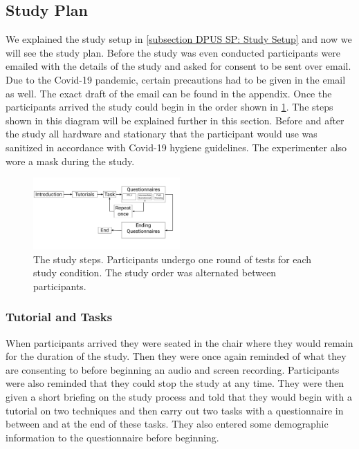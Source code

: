 \subsection{Study Plan}
\label{subsection DPUS SP: Study Plan}
We explained the study setup in \cref{subsection DPUS SP: Study Setup} and now we will see the study plan. Before the study was even conducted participants were emailed with the details of the study and asked for consent to be sent over email. Due to the Covid-19 pandemic, certain precautions had to be given in the email as well. The exact draft of the email can be found in the appendix. Once the participants arrived the study could begin in the order shown in \cref{fig:study-plan}. The steps shown in this diagram will be explained further in this section. Before and after the study all hardware and stationary that the participant would use was sanitized in accordance with Covid-19 hygiene guidelines. The experimenter also wore a mask during the study.

\begin{figure}[]
	\centering
	\includegraphics[width=0.5\textwidth]{images/study-plan.pdf}
	\caption{The study steps. Participants undergo one round of tests for each study condition. The study order was alternated between participants.}
	\label{fig:study-plan}
\end{figure}

\subsubsection{Tutorial and Tasks}
\label{subsubsection DPUS SP SP: Tutorial and Tasks}
When participants arrived they were seated in the chair where they would remain for the duration of the study. Then they were once again reminded of what they are consenting to before beginning an audio and screen recording. Participants were also reminded that they could stop the study at any time. They were then given a short briefing on the study process and told that they would begin with a tutorial on two techniques and then carry out two tasks with a questionnaire in between and at the end of these tasks. They also entered some demographic information to the questionnaire before beginning.

